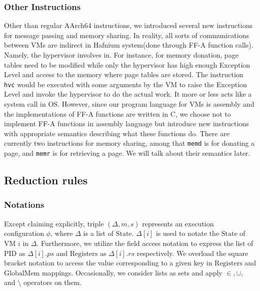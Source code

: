 \documentclass[a4paper]{article}
\newcommand*{\STATE}{\text{State}}
\newcommand*{\MEM}{\text{GlobalMem}}
\newcommand*{\PID}{\text{PID}}
\newcommand*{\REGS}{\text{Registers}}
\begin{document}
\subsubsection{Other Instructions}
Other than regular AArch64 instructions, we introduced several new instructions
for message passing and memory sharing. In reality, all sorts of communications
between VMs are indirect in Hafnium system(done through FF-A function calls).
Namely, the hypervisor involves in. For instance, for memory donation, page
tables need to be modified while only the hypervisor has high enough Exception
Level and access to the memory where page tables are stored. The instruction
\texttt{hvc} would be executed with some arguments by the VM to raise the
Exception Level and invoke the hypervisor to do the actual work. It more or less
acts like a system call in OS. However, since our program language for VMs is
assembly and the implementations of FF-A functions are written in C, we choose
not to implement FF-A functions in assembly language but introduce new
instructions with appropriate semantics describing what these functions do.
There are currently two instructions for memory sharing, among that
\texttt{memd} is for donating a page, and \texttt{memr} is for retrieving a
page. We will talk about their semantics later.




\subsection{Reduction rules}
\subsubsection{Notations}
Except claiming explicitly, triple $(\Delta, m, s)$ represents an execution
configuration $\phi$, where $\Delta$ is a list of $\STATE$. $\Delta[i]$ is used
to notate the $\STATE$ of VM $i$ in $\Delta$. Furthermore, we utilize the field
access notation to express the list of $\PID$ as $\Delta[i].ps$ and $\REGS$ as
$\Delta[i].rs$ respectively. We overload the square bracket notation to access
the value corresponding to a given key in $\REGS$ and $\MEM$ mappings. Occasionally, we
consider lists as sets and apply $\in, \cup,$ and $\setminus$ operators on them.

\end{document}
